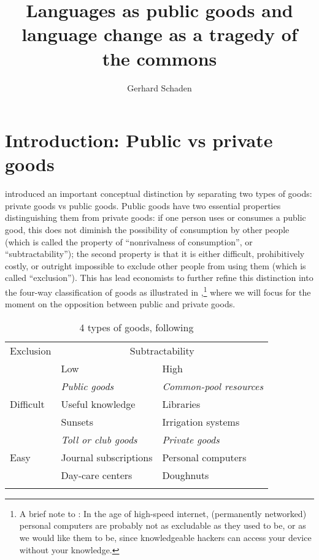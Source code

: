 \documentclass[output=paper,hidelinks]{langscibook}
\title[Languages as public goods]{Languages as public goods and language change as a tragedy of the commons}
\author{Gerhard Schaden\affiliation{Université de Lille; CNRS UMR 8163 STL}}
\begin{document}
\let\PRES\PRS
\maketitle

\section{Introduction: Public vs private goods}

\citet{samuelson54} introduced an important conceptual distinction by separating two types of goods: private goods vs public goods. Public goods have two essential properties distinguishing them from private goods: if one person uses or consumes a public good, this does not diminish the possibility of consumption by other people (which is called the property of ``nonrivalness of consumption'', or ``subtractability''); the second property is that it is either difficult, prohibitively costly, or outright impossible to exclude other people from using them (which is called ``exclusion''). This has lead economists to further refine this distinction into the four-way classification of goods as illustrated in ,\footnote{A brief note to : In the age of high-speed internet, (permanently networked) personal computers are probably not as excludable as they used to be, or as we would like them to be, since knowledgeable hackers can access your device without your knowledge.} where we will focus for the moment on the opposition between public and private goods.

\begin{table}
\caption{4 types of goods, following \citet[9]{hessostrom07a}\label{tab:goods}}
\begin{tabular}{lll}
  \lsptoprule
  Exclusion & \multicolumn{2}{c}{Subtractability}\\\cmidrule(lr){2-3}
            & Low  & High\\\midrule
            &  \textit{Public goods} & \textit{Common-pool resources}\\
  Difficult &  Useful knowledge      &   Libraries\\
            &  Sunsets               &  Irrigation systems\\\midrule
            & \textit{Toll or club goods} & \textit{Private goods}\\
  Easy      & Journal subscriptions   & Personal computers\\
            & Day-care centers        & Doughnuts\\
  \lspbottomrule
\end{tabular}
\end{table}
\end{document}
